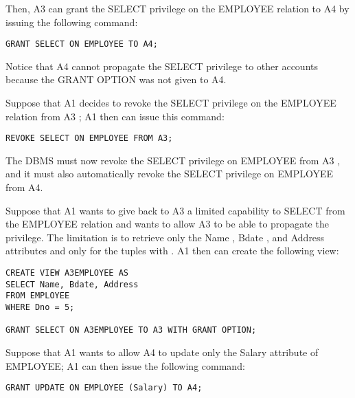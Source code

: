     \par Then,  A3 can grant the SELECT privilege on the EMPLOYEE relation to A4 by issuing the following command:

\begin{verbatim}
GRANT SELECT ON EMPLOYEE TO A4;
\end{verbatim}
    
    \par Notice that A4 cannot propagate the SELECT privilege to other accounts because the GRANT OPTION was not given to A4.

    \par {}
    \par Suppose that A1 decides to revoke the SELECT privilege on the EMPLOYEE relation from A3 ; A1 then can issue this command:

\begin{verbatim}
REVOKE SELECT ON EMPLOYEE FROM A3;
\end{verbatim}

    \par The DBMS must now revoke the SELECT privilege on EMPLOYEE from A3 , and it must also automatically revoke the SELECT privilege on EMPLOYEE from A4.

    \par {}
    \par Suppose that A1 wants to give back to A3 a limited capability to SELECT from the EMPLOYEE relation and wants to allow A3 to be able to propagate the privilege. The limitation is to retrieve only the Name , Bdate , and Address attributes and only for the tuples with . A1 then can create the following view:

\begin{verbatim}
CREATE VIEW A3EMPLOYEE AS
SELECT Name, Bdate, Address
FROM EMPLOYEE
WHERE Dno = 5;

GRANT SELECT ON A3EMPLOYEE TO A3 WITH GRANT OPTION;
\end{verbatim}

    \par {}
    \par Suppose that A1 wants to allow A4 to update only the Salary attribute of EMPLOYEE; A1 can then issue the following command:

\begin{verbatim}
GRANT UPDATE ON EMPLOYEE (Salary) TO A4;
\end{verbatim}
    
